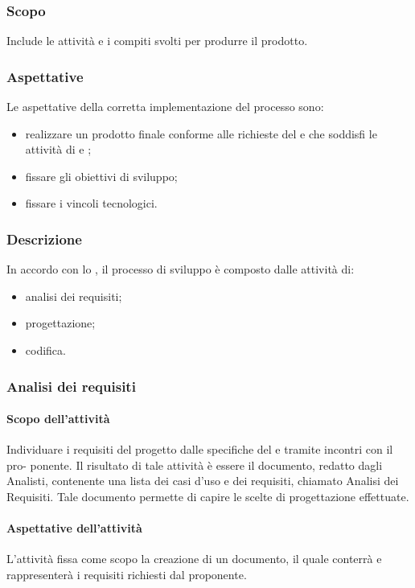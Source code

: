 \subsubsection{Scopo}
Include le attività e i compiti svolti per produrre il prodotto.
\subsubsection{Aspettative}
Le aspettative della corretta implementazione del processo sono:
\begin{itemize}
		\item realizzare un prodotto finale conforme alle richieste del  e che soddisfi le attività di  e ;
		\item fissare gli obiettivi di sviluppo;
		\item fissare i vincoli tecnologici.
\end{itemize}		

\subsubsection{Descrizione}
In accordo con lo  , il processo di sviluppo è composto dalle attività di:
\begin{itemize}
		\item analisi dei requisiti;
		\item progettazione;
		\item codifica.
\end{itemize}

\subsubsection{Analisi dei requisiti}
 \paragraph{Scopo dell'attività}
  Individuare i requisiti del progetto dalle specifiche del  e tramite incontri con il pro-
  ponente. Il risultato di tale attività è essere il documento, redatto dagli Analisti, contenente una
 lista dei casi d’uso e dei requisiti, chiamato Analisi dei Requisiti. Tale documento permette di
 capire le scelte di progettazione effettuate.
 \paragraph{Aspettative dell'attività}
 L'attività fissa come scopo la creazione di un documento, il quale conterrà e rappresenterà i requisiti richiesti dal proponente.
